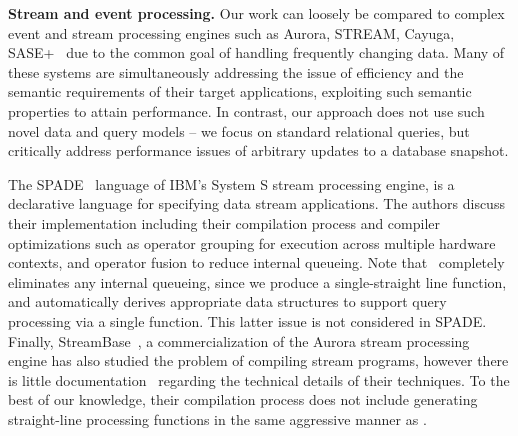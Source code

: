 \noindent \textbf{Stream and event processing.}
Our work can loosely be compared to complex event and stream processing engines
such as Aurora, STREAM, Cayuga,
SASE+~\cite{wu-sigmod:06,agrawal-sigmod:08,white-pods:07,motwani-cidr:03,abadi-vldbj:03}
due to the common goal of handling frequently changing data.
Many of these systems are simultaneously addressing the issue of efficiency and
the semantic requirements of their target applications, exploiting such semantic
properties to attain performance. In contrast, our approach does not use such
novel data and query models -- we focus on standard relational queries, but
critically address performance issues of arbitrary updates to a database
snapshot.


The SPADE~\cite{gedik-sigmod:08} language of IBM's System S stream processing
engine, is a declarative language for specifying data stream applications. The
authors discuss their implementation including their compilation process and
compiler optimizations such as operator grouping for execution across multiple
hardware contexts, and operator fusion to reduce internal queueing. Note that
\compiler\ completely eliminates any internal queueing, since we produce a
single-straight line function, and automatically derives appropriate data
structures to support query processing via a single function. This latter issue
is not considered in SPADE. Finally, StreamBase~\cite{streambase}, a
commercialization of the Aurora stream processing engine has also studied the
problem of compiling stream programs, however there is little
documentation~\cite{sb-patent} regarding the technical details of their
techniques. To the best of our knowledge, their compilation process does not
include generating straight-line processing functions in the same aggressive
manner as \compiler.

